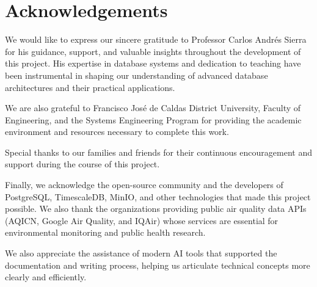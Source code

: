 \chapter*{\center \Large  Acknowledgements}

We would like to express our sincere gratitude to Professor Carlos Andrés Sierra for his guidance, support, and valuable insights throughout the development of this project. His expertise in database systems and dedication to teaching have been instrumental in shaping our understanding of advanced database architectures and their practical applications.

We are also grateful to Francisco José de Caldas District University, Faculty of Engineering, and the Systems Engineering Program for providing the academic environment and resources necessary to complete this work.

Special thanks to our families and friends for their continuous encouragement and support during the course of this project.

Finally, we acknowledge the open-source community and the developers of PostgreSQL, TimescaleDB, MinIO, and other technologies that made this project possible. We also thank the organizations providing public air quality data APIs (AQICN, Google Air Quality, and IQAir) whose services are essential for environmental monitoring and public health research.

We also appreciate the assistance of modern AI tools that supported the documentation and writing process, helping us articulate technical concepts more clearly and efficiently.  

